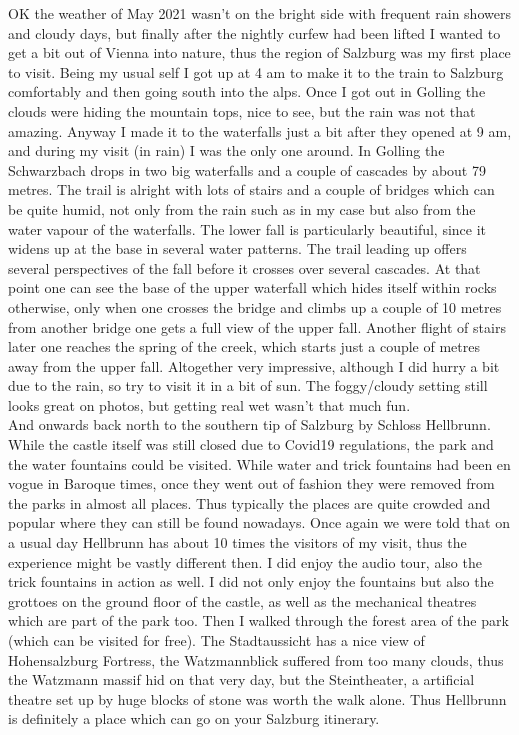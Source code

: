 OK the weather of May 2021 wasn't on the bright side with frequent rain showers and cloudy days, but finally after the nightly curfew had been lifted I wanted to get a bit out of Vienna into nature, thus the region of Salzburg was my first place to visit. Being my usual self I got up at 4 am to make it to the train to Salzburg comfortably and then going south into the alps. Once I got out in Golling the clouds were hiding the mountain tops, nice to see, but the rain was not that amazing. Anyway I made it to the waterfalls just a bit after they opened at 9 am, and during my visit (in rain) I was the only one around. In Golling the Schwarzbach drops in two big waterfalls and a couple of cascades by about 79 metres. The trail is alright with lots of stairs and a couple of bridges which can be quite humid, not only from the rain such as in my case but also from the water vapour of the waterfalls. The lower fall is particularly beautiful, since it widens up at the base in several water patterns. The trail leading up offers several perspectives of the fall before it crosses over several cascades. At that point one can see the base of the upper waterfall which hides itself within rocks otherwise, only when one crosses the bridge and climbs up a couple of 10 metres from another bridge one gets a full view of the upper fall. Another flight of stairs later one reaches the spring of the creek, which starts just a couple of metres away from the upper fall. Altogether very impressive, although I did hurry a bit due to the rain, so try to visit it in a bit of sun. The foggy/cloudy setting still looks great on photos, but getting real wet wasn't that much fun.\\
And onwards back north to the southern tip of Salzburg by Schloss Hellbrunn. While the castle itself was still closed due to Covid19 regulations, the park and the water fountains could be visited. While water and trick fountains had been en vogue in Baroque times, once they went out of fashion they were removed from the parks in almost all places. Thus typically the places are quite crowded and popular where they can still be found nowadays. Once again we were told that on a usual day Hellbrunn has about 10 times the visitors of my visit, thus the experience might be vastly different then. I did enjoy the audio tour, also the trick fountains in action as well. I did not only enjoy the fountains but also the grottoes on the ground floor of the castle, as well as the mechanical theatres which are part of the park too. Then I walked through the forest area of the park (which can be visited for free). The Stadtaussicht has a nice view of Hohensalzburg Fortress, the Watzmannblick suffered from too many clouds, thus the Watzmann massif hid on that very day, but the Steintheater, a artificial theatre set up by huge blocks of stone was worth the walk alone. Thus Hellbrunn is definitely a place which can go on your Salzburg itinerary.\\

